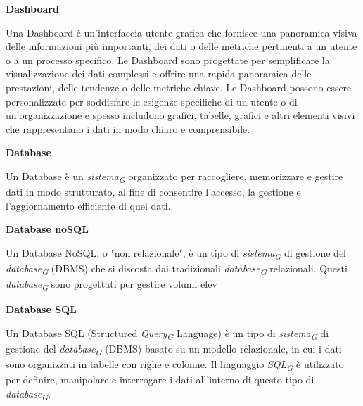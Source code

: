 \documentclass{article}
\begin{document}
\vspace{0.4cm}

\textbf{Dashboard}

\vspace{0.1cm}

Una Dashboard è un'interfaccia utente grafica che fornisce una panoramica visiva delle informazioni più importanti, dei dati o delle metriche pertinenti a un utente o a un processo specifico. Le Dashboard sono progettate per semplificare la visualizzazione dei dati complessi e offrire una rapida panoramica delle prestazioni, delle tendenze o delle metriche chiave. Le Dashboard possono essere personalizzate per soddisfare le esigenze specifiche di un utente o di un'organizzazione e spesso includono grafici, tabelle, grafici e altri elementi visivi che rappresentano i dati in modo chiaro e comprensibile.

\vspace{0.4cm}

\textbf{Database}

\vspace{0.1cm}

Un Database è un \textit{sistema}\textsubscript{\textit{G}} organizzato per raccogliere, memorizzare e gestire dati in modo strutturato, al fine di consentire l'accesso, la gestione e l'aggiornamento efficiente di quei dati.

\vspace{0.4cm}

\textbf{Database noSQL}

\vspace{0.1cm}

Un Database NoSQL, o "non relazionale", è un tipo di \textit{sistema}\textsubscript{\textit{G}} di gestione del \textit{database}\textsubscript{\textit{G}} (DBMS) che si discosta dai tradizionali \textit{database}\textsubscript{\textit{G}} relazionali. Questi \textit{database}\textsubscript{\textit{G}} sono progettati per gestire volumi elev

\vspace{0.4cm}

\textbf{Database SQL}

\vspace{0.1cm}

Un Database SQL (Structured \textit{Query}\textsubscript{\textit{G}} Language) è un tipo di \textit{sistema}\textsubscript{\textit{G}} di gestione del \textit{database}\textsubscript{\textit{G}} (DBMS) basato su un modello relazionale, in cui i dati sono organizzati in tabelle con righe e colonne. Il linguaggio \textit{SQL}\textsubscript{\textit{G}} è utilizzato per definire, manipolare e interrogare i dati all'interno di questo tipo di \textit{database}\textsubscript{\textit{G}}.
\end{document}
